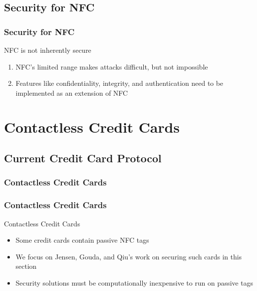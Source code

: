 \documentclass[unknownkeysallowed]{beamer}
\begin{document}
\subsection{Security for NFC}
\begin{frame}
\frametitle{Security for NFC}
  \begin{center}
  \begin{minipage}{.7\textwidth}
  \begin{block}{NFC is not inherently secure}
    \begin{enumerate}
      \item{NFC's limited range makes attacks difficult, but not impossible}
      \item{Features like confidentiality, integrity, and authentication need to be implemented as an extension of NFC}
    \end{enumerate}
  \end{block}
  \end{minipage}
  \end{center}
\end{frame}

\section{Contactless Credit Cards}
\subsection{Current Credit Card Protocol}
\begin{frame}
  \frametitle{Contactless Credit Cards}
    \begin{center}\begin{minipage}{.9\textwidth}
    \tableofcontents[currentsubsection, hideothersubsections, sectionstyle=show/shaded]
    \end{minipage}\end{center}
\end{frame}
%
\begin{frame}
\frametitle{Contactless Credit Cards}
  \begin{center}
  \begin{minipage}{.9\textwidth}
  \begin{block}{Contactless Credit Cards}
    \begin{itemize}
      \item{Some credit cards contain passive NFC tags}
      \pause
      \item{We focus on Jensen, Gouda, and Qiu's work on securing such cards in this section}
      \pause
      \item{Security solutions must be computationally inexpensive to run on passive tags}
    \end{itemize}
  \end{block}
  \end{minipage}
  \end{center}
\end{frame}
\end{document}
